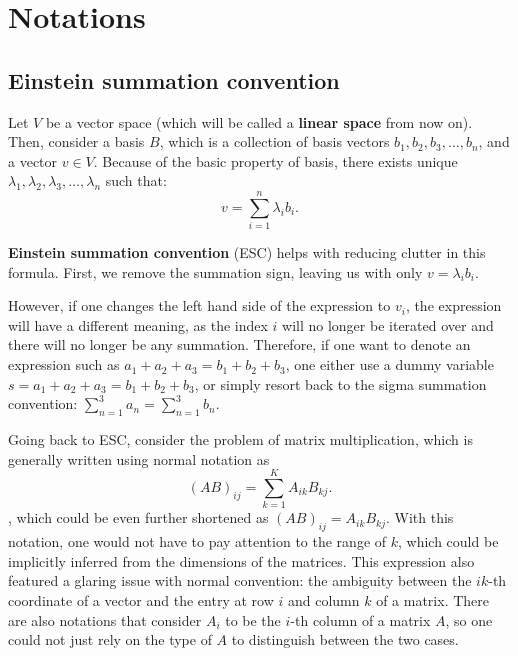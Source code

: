 \chapter{Notations} %
\label{chap:Notations}

\section{Einstein summation convention} %
\label{sec:Einstein summation convention}

Let \( V \) be a vector space (which will be called a \textbf{linear space} from
now on). Then, consider a basis \( B \), which is a collection of basis vectors
\( b_{1}, b_{2}, b_{3}, \ldots, b_n \), and a vector \( v \in V \). Because of
the basic property of basis, there exists unique \( \lambda_{1}, \lambda_{2},
\lambda_{3}, \ldots, \lambda_n \) such that:
\[
  v = \sum_{i=1}^{n} \lambda_i b_i
.\] 

\textbf{Einstein summation convention} (ESC) helps with reducing clutter in
this formula. First, we remove the summation sign, leaving us with only \(
v=\lambda _{i} b _{i} \).

However, if one changes the left hand side of the expression to \( v_{i} \), the
expression will have a different meaning, as the index \( i \) will no longer be
iterated over and there will no longer be any summation. Therefore, if one want
to denote an expression such as \( a_{1}+a_{2}+a_{3}=b_{1}+b_{2}+b_{3} \), one
either use a dummy variable \( s = a_{1}+a_{2}+a_{3}=b_{1}+b_{2}+b_{3} \), or
simply resort back to the sigma summation convention: \( \sum_{n=1}^{3}
a_{n}=\sum_{n=1}^{3} b_{n} \).

Going back to ESC, consider the problem of matrix multiplication, which is
generally written using normal notation as
\[
  (AB)_{ij} = \sum_{k=1}^{K} A_{ik}B_{kj}
.\] , which could be even further shortened as \( (AB)_{ij} = A_{ik}B_{kj} \).
With this notation, one would not have to pay attention to the range of \( k \),
which could be implicitly inferred from the dimensions of the matrices. This
expression also featured a glaring issue with normal convention: the ambiguity
between the \( ik \)-th coordinate of a vector and the entry at row \( i \) and
column \( k \) of a matrix. There are also notations that consider \( A_{i} \)
to be the \( i \)-th column of a matrix \( A \), so one could not just rely on
the type of \( A \) to distinguish between the two cases.

